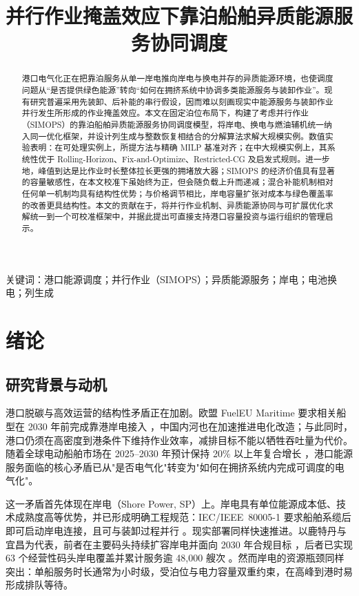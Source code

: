 \documentclass[UTF8, a4paper, 12pt]{ctexart}
\theoremstyle{plain}
\theoremstyle{definition}
\theoremstyle{remark}
\begin{document}
\title{\heiti{} 并行作业掩盖效应下靠泊船舶异质能源服务协同调度}
\author{}
\date{}
\maketitle

\begin{abstract}
港口电气化正在把靠泊服务从单一岸电推向岸电与换电并存的异质能源环境，也使调度问题从“是否提供绿色能源”转向“如何在拥挤系统中协调多类能源服务与装卸作业”。现有研究普遍采用先装卸、后补能的串行假设，因而难以刻画现实中能源服务与装卸作业并行发生所形成的作业掩盖效应。本文在固定泊位布局下，构建了考虑并行作业（SIMOPS）的靠泊船舶异质能源服务协同调度模型，将岸电、换电与燃油辅机统一纳入同一优化框架，并设计列生成与整数恢复相结合的分解算法求解大规模实例。数值实验表明：在可处理实例上，所提方法与精确 MILP 基准对齐；在中大规模实例上，其系统性优于 Rolling-Horizon、Fix-and-Optimize、Restricted-CG 及启发式规则。进一步地，峰值到达是比作业时长整体拉长更强的拥堵放大器；SIMOPS 的经济价值具有显著的容量敏感性，在本文校准下虽始终为正，但会随负载上升而递减；混合补能机制相对任何单一机制均具有结构性优势；与价格调节相比，岸电容量扩张对成本与绿色覆盖率的改善更具结构性。本文的贡献在于，将并行作业机制、异质能源协同与可扩展优化求解统一到一个可校准框架中，并据此提出可直接支持港口容量投资与运行组织的管理启示。
\end{abstract}

\noindent 关键词：港口能源调度；并行作业（SIMOPS）；异质能源服务；岸电；电池换电；列生成

\section{绪论}
\label{sec:intro}

\subsection{研究背景与动机}
港口脱碳与高效运营的结构性矛盾正在加剧。欧盟 FuelEU Maritime 要求相关船型在 2030 年前完成靠港岸电接入 \citep{EU2025}，中国内河也在加速推进电化改造；与此同时，港口仍须在高密度到港条件下维持作业效率，减排目标不能以牺牲吞吐量为代价。随着全球电动船舶市场在 2025--2030 年预计保持 20\% 以上年复合增长 \citep{Markets2025}，港口能源服务面临的核心矛盾已从"是否电气化"转变为"如何在拥挤系统内完成可调度的电气化"。
 
这一矛盾首先体现在岸电（Shore Power, SP）上。岸电具有单位能源成本低、技术成熟度高等优势，并已形成明确工程规范：IEC/IEEE~80005-1 要求船舶系缆后即可启动岸电连接，且可与装卸过程并行 \citep{IEC80005}。现实部署同样快速推进。以鹿特丹与宜昌为代表，前者在主要码头持续扩容岸电并面向 2030 年合规目标 \citep{Winkel2016}，后者已实现 63 个经营性码头岸电覆盖并累计服务逾 48{,}000 艘次 \citep{ICCT2023}。然而岸电的资源瓶颈同样突出：单船服务时长通常为小时级，受泊位与电力容量双重约束，在高峰到港时易形成排队等待。
 
\end{document}
